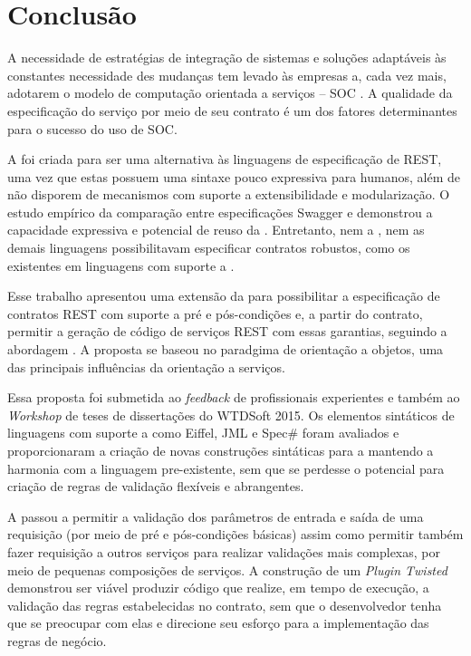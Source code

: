 

\section{Conclusão}

A necessidade de estratégias de integração de sistemas e soluções adaptáveis às
constantes necessidade des mudanças tem levado às empresas a, cada vez mais,
adotarem o modelo de computação orientada a serviços -- SOC
\cite{papazoglou2008service} \cite{erl2009web}. A qualidade da especificação do
serviço por meio de seu contrato é um dos fatores determinantes para o sucesso
do uso de SOC.

A \neoidl{} foi criada para ser uma alternativa às linguagens de especificação
de \wss REST, uma vez que estas possuem uma sintaxe pouco expressiva para humanos,
além de não disporem de mecanismos com suporte a extensibilidade e modularização. O estudo
empírico da comparação entre especificações Swagger e \neoidl{} demonstrou a capacidade
expressiva e potencial de reuso da \neoidl{}. 
Entretanto, nem a \neoidl{}, nem as demais linguagens possibilitavam especificar 
contratos robustos, como os existentes em linguagens com suporte a \designbycontract{}.

Esse trabalho apresentou uma extensão da \neoidl{} para possibilitar a especificação
de contratos REST com suporte a pré e pós-condições e, a partir do contrato, permitir
a geração de código de serviços REST com essas garantias, seguindo a abordagem
\CtFirst{}. A proposta se baseou no paradgima de orientação a objetos, uma das 
principais influências da orientação a serviços.

Essa proposta foi submetida ao \textit{feedback} de profissionais experientes e também ao 
\textit{Workshop} de teses de dissertações do WTDSoft 2015. Os elementos sintáticos
de linguagens com suporte a \designbycontract{} como Eiffel, JML e Spec\# foram avaliados
e proporcionaram a criação de novas construções sintáticas para a \neoidl{} mantendo a harmonia com 
a linguagem pre-existente, sem que se perdesse o potencial para criação de regras de validação flexíveis e abrangentes.

A \neoidl{} passou a permitir a validação dos parâmetros de entrada e saída de uma requisição (por meio
de pré e pós-condições básicas) assim como permitir também fazer requisição a outros serviços para realizar validações mais
complexas, por meio de pequenas composições de serviços. A construção de um \textit{Plugin Twisted} demonstrou ser
viável produzir código que realize, em tempo de execução, a validação das regras estabelecidas no contrato, sem que o 
desenvolvedor tenha que se preocupar com elas e direcione seu esforço para a implementação das regras
de negócio.


